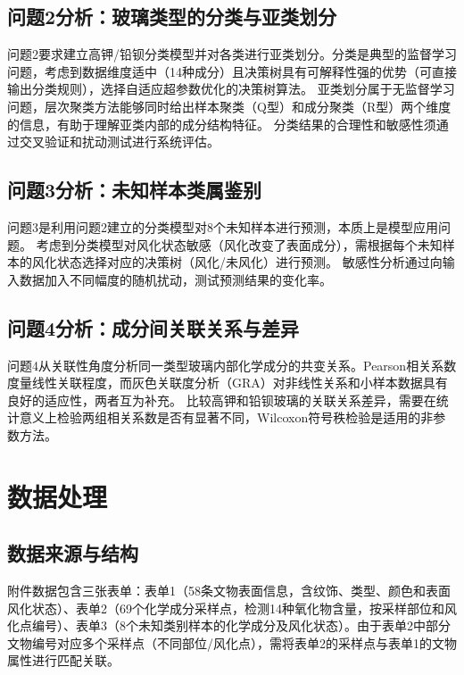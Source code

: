 \documentclass[12pt,a4paper]{ctexart}
\begin{document}
\subsection{问题2分析：玻璃类型的分类与亚类划分}

问题2要求建立高钾/铅钡分类模型并对各类进行亚类划分。分类是典型的监督学习问题，考虑到数据维度适中（14种成分）且决策树具有可解释性强的优势（可直接输出分类规则），选择自适应超参数优化的决策树算法。
亚类划分属于无监督学习问题，层次聚类方法能够同时给出样本聚类（Q型）和成分聚类（R型）两个维度的信息，有助于理解亚类内部的成分结构特征。
分类结果的合理性和敏感性须通过交叉验证和扰动测试进行系统评估。

\subsection{问题3分析：未知样本类属鉴别}

问题3是利用问题2建立的分类模型对8个未知样本进行预测，本质上是模型应用问题。
考虑到分类模型对风化状态敏感（风化改变了表面成分），需根据每个未知样本的风化状态选择对应的决策树（风化/未风化）进行预测。
敏感性分析通过向输入数据加入不同幅度的随机扰动，测试预测结果的变化率。

\subsection{问题4分析：成分间关联关系与差异}

问题4从关联性角度分析同一类型玻璃内部化学成分的共变关系。Pearson相关系数度量线性关联程度，而灰色关联度分析（GRA）对非线性关系和小样本数据具有良好的适应性\cite{4}，两者互为补充。
比较高钾和铅钡玻璃的关联关系差异，需要在统计意义上检验两组相关系数是否有显著不同，Wilcoxon符号秩检验是适用的非参数方法。

\newpage

\section{数据处理}

\subsection{数据来源与结构}

附件数据包含三张表单：表单1（58条文物表面信息，含纹饰、类型、颜色和表面风化状态）、表单2（69个化学成分采样点，检测14种氧化物含量，按采样部位和风化点编号）、表单3（8个未知类别样本的化学成分及风化状态）。由于表单2中部分文物编号对应多个采样点（不同部位/风化点），需将表单2的采样点与表单1的文物属性进行匹配关联。
\end{document}
